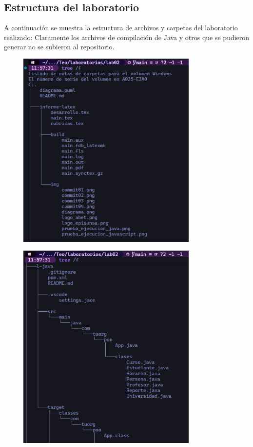 \subsection {Estructura del laboratorio}

A continuación se muestra la estructura de archivos y carpetas del laboratorio realizado:
Claramente los archivos de compilación de Java y otros que se pudieron generar no se subieron al repositorio.

\begin{figure}[H]
    \centering
    \includegraphics[width=0.8\textwidth]{img/estructura01.png}
\end{figure}

\begin{figure}[H]
    \centering
    \includegraphics[width=0.8\textwidth]{img/estructura02.png}
\end{figure}

